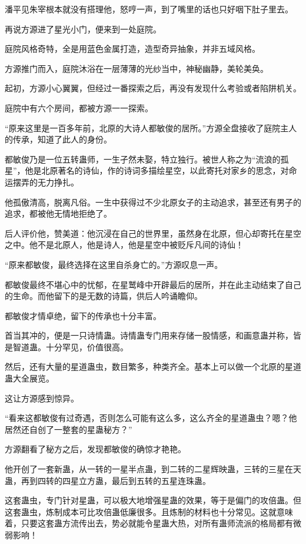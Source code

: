 \begin{this_body}
潘平见朱宰根本就没有搭理他，怒哼一声，到了嘴里的话也只好咽下肚子里去。

再说方源进了星光小门，便来到一处庭院。

庭院风格奇特，全是用蓝色金属打造，造型奇异抽象，并非五域风格。

方源推门而入，庭院沐浴在一层薄薄的光纱当中，神秘幽静，美轮美奂。

起初，方源小心翼翼，但经过一番探索之后，再没有发现什么考验或者陷阱机关。

庭院中有六个房间，都被方源一一探索。

“原来这里是一百多年前，北原的大诗人都敏俊的居所。”方源全盘接收了庭院主人的传承，知道了此人的身份。

都敏俊乃是一位五转蛊师，一生孑然未娶，特立独行。被世人称之为“流浪的孤星”，他是北原著名的诗仙，作的诗词多描绘星空，以此寄托对家乡的思念，对命运摆弄的无力挣扎。

他孤傲清高，脱离凡俗。一生中获得过不少北原女子的主动追求，甚至还有男子的追求，都被他无情地拒绝了。

后人评价他，赞美道：他沉浸在自己的世界里，虽然身在北原，但心却寄托在星空之中。他不是北原人，他是诗人，他是星空中被贬斥凡间的诗仙！

“原来都敏俊，最终选择在这里自杀身亡的。”方源叹息一声。

都敏俊最终不堪心中的忧郁，在星鹫峰中开辟最后的居所，并在此主动结束了自己的生命。而他留下的是无数的诗篇，供后人吟诵瞻仰。

都敏俊才情卓绝，留下的传承也十分丰富。

首当其冲的，便是一只诗情蛊。诗情蛊专门用来存储一股情感，和画意蛊并称，皆是智道蛊。十分罕见，价值很高。

然后，还有大量的星道蛊虫，数目繁多，种类齐全。基本上可以做一个北原的星道蛊大全展览。

这让方源感到惊异。

“看来这都敏俊有过奇遇，否则怎么可能有这么多，这么齐全的星道蛊虫？嗯？他居然还自创了一整套的星蛊秘方？”

方源翻看了秘方之后，发现都敏俊的确惊才艳艳。

他开创了一套新蛊，从一转的一星半点蛊，到二转的二星辉映蛊，三转的三星在天蛊，再到四转的四星立方蛊，最后到五转的五星连珠蛊。

这套蛊虫，专门针对星蛊，可以极大地增强星蛊的效果，等于是偏门的攻倍蛊。但这套蛊虫，炼制成本可比攻倍蛊低廉很多。且炼制的材料也十分常见。这就意味着，只要这套蛊方流传出去，势必就能令星蛊大热，对所有蛊师流派的格局都有微弱影响！

\end{this_body}

